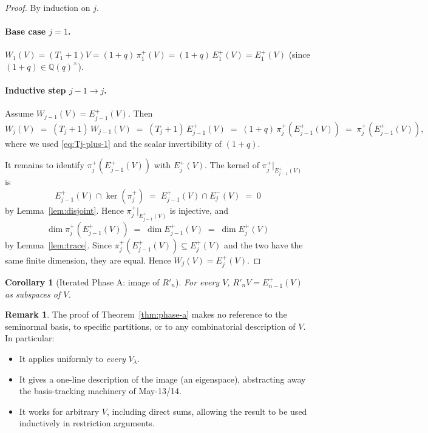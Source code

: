 \documentclass[11pt]{article}
\newtheorem{corollary}[theorem]{Corollary}
\theoremstyle{definition}
\newtheorem{remark}[theorem]{Remark}
\begin{document}
\begin{proof}
By induction on $j$.

\paragraph{Base case $j = 1$.}  $W_1(V) = (T_1 + 1) V = (1 + q)\,
\pi_1^+(V) = (1 + q)\, E_1^+(V) = E_1^+(V)$ (since $(1 + q) \in
\mathbb{Q}(q)^\times$).

\paragraph{Inductive step $j - 1 \to j$.}  Assume $W_{j-1}(V) =
E_{j-1}^+(V)$.  Then
\[
   W_j(V) \;=\; (T_j + 1)\, W_{j-1}(V)
            \;=\; (T_j + 1)\, E_{j-1}^+(V)
            \;=\; (1 + q)\, \pi_j^+(E_{j-1}^+(V))
            \;=\; \pi_j^+(E_{j-1}^+(V)),
\]
where we used \eqref{eq:Tj-plus-1} and the scalar invertibility of
$(1 + q)$.

It remains to identify $\pi_j^+(E_{j-1}^+(V))$ with $E_j^+(V)$.
The kernel of $\pi_j^+|_{E_{j-1}^+(V)}$ is
\[
   E_{j-1}^+(V) \cap \ker(\pi_j^+)
   \;=\;
   E_{j-1}^+(V) \cap E_j^-(V)
   \;=\; 0
\]
by Lemma~\ref{lem:disjoint}.  Hence $\pi_j^+|_{E_{j-1}^+(V)}$ is
injective, and
\[
   \dim \pi_j^+(E_{j-1}^+(V)) \;=\; \dim E_{j-1}^+(V)
   \;=\; \dim E_j^+(V)
\]
by Lemma~\ref{lem:trace}.  Since $\pi_j^+(E_{j-1}^+(V)) \subseteq
E_j^+(V)$ and the two have the same finite dimension, they are
equal.  Hence $W_j(V) = E_j^+(V)$.
\end{proof}

\begin{corollary}[Iterated Phase A: image of $R'_n$]
\label{cor:R-n-image}
For every $V$, $R'_n V = E_{n-1}^+(V)$ as subspaces of $V$.
\end{corollary}

\begin{remark}
The proof of Theorem~\ref{thm:phase-a} makes no reference to the
seminormal basis, to specific partitions, or to any combinatorial
description of $V$.  In particular:
\begin{itemize}[leftmargin=2em,topsep=0.3em,itemsep=0.2em]
\item It applies uniformly to \emph{every} $V_\lambda$.
\item It gives a one-line description of the image (an eigenspace),
abstracting away the basis-tracking machinery of May-13/14.
\item It works for arbitrary $V$, including direct sums, allowing
the result to be used inductively in restriction arguments.
\end{itemize}
\end{remark}
\end{document}
